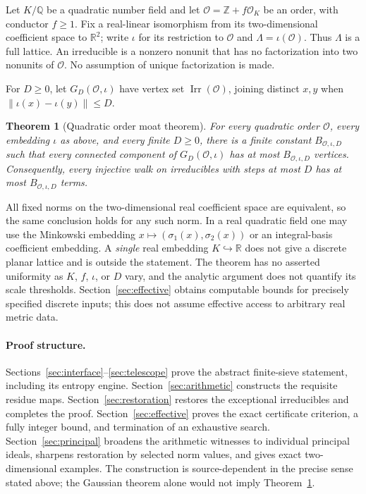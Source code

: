 \documentclass[11pt]{article}
\numberwithin{equation}{section}
\newtheorem{theorem}{Theorem}[section]
\theoremstyle{definition}\newtheorem{definition}[theorem]{Definition}
\theoremstyle{remark}\newtheorem{remark}[theorem]{Remark}
\newcommand{\Z}{\mathbb Z}\newcommand{\Q}{\mathbb Q}\newcommand{\R}{\mathbb R}
\newcommand{\OO}{\mathcal O}\newcommand{\PP}{\mathcal P}
\newcommand{\norm}[1]{\lVert #1\rVert}
\newcommand{\Irr}{\operatorname{Irr}}
\begin{document}
Let $K/\Q$ be a quadratic number field and let $\OO=\Z+f\OO_K$ be an order, with conductor $f\ge1$. Fix a real-linear isomorphism from its two-dimensional coefficient space to $\R^2$; write $\iota$ for its restriction to $\OO$ and $\Lambda=\iota(\OO)$. Thus $\Lambda$ is a full lattice. An irreducible is a nonzero nonunit that has no factorization into two nonunits of $\OO$. No assumption of unique factorization is made.

For $D\ge0$, let $G_D(\OO,\iota)$ have vertex set $\Irr(\OO)$, joining distinct $x,y$ when $\norm{\iota(x)-\iota(y)}\le D$.

\begin{theorem}[Quadratic order moat theorem]\label{thm:main}
For every quadratic order $\OO$, every embedding $\iota$ as above, and every finite $D\ge0$, there is a finite constant $B_{\OO,\iota,D}$ such that every connected component of $G_D(\OO,\iota)$ has at most $B_{\OO,\iota,D}$ vertices. Consequently, every injective walk on irreducibles with steps at most $D$ has at most $B_{\OO,\iota,D}$ terms.
\end{theorem}

All fixed norms on the two-dimensional real coefficient space are equivalent, so the same conclusion holds for any such norm. In a real quadratic field one may use the Minkowski embedding $x\mapsto(\sigma_1(x),\sigma_2(x))$ or an integral-basis coefficient embedding. A \emph{single} real embedding $K\hookrightarrow\R$ does not give a discrete planar lattice and is outside the statement. The theorem has no asserted uniformity as $K$, $f$, $\iota$, or $D$ vary, and the analytic argument does not quantify its scale thresholds. Section~\ref{sec:effective} obtains computable bounds for precisely specified discrete inputs; this does not assume effective access to arbitrary real metric data.

\paragraph{Proof structure.}
Sections~\ref{sec:interface}--\ref{sec:telescope} prove the abstract finite-sieve statement, including its entropy engine. Section~\ref{sec:arithmetic} constructs the requisite residue maps. Section~\ref{sec:restoration} restores the exceptional irreducibles and completes the proof. Section~\ref{sec:effective} proves the exact certificate criterion, a fully integer bound, and termination of an exhaustive search. Section~\ref{sec:principal} broadens the arithmetic witnesses to individual principal ideals, sharpens restoration by selected norm values, and gives exact two-dimensional examples. The construction is source-dependent in the precise sense stated above; the Gaussian theorem alone would not imply Theorem~\ref{thm:main}.
\end{document}
